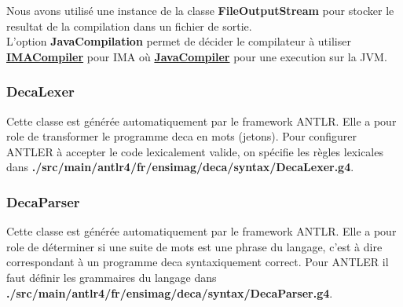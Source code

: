 \documentclass[12pt, a4paper, one side]{article}
\begin{document}
    Nous avons utilisé une instance de la classe \textbf{FileOutputStream} pour stocker le resultat de la compilation dans un fichier de sortie.\\

    L'option \textbf{JavaCompilation} permet de décider le compilateur à utiliser \textbf{\underline{IMACompiler}} pour IMA où \textbf{\underline{JavaCompiler}} pour une execution sur la JVM.

    \subsubsection{DecaLexer} Cette classe est générée automatiquement par le framework ANTLR. Elle a pour role de transformer le programme deca en mots (jetons). Pour configurer ANTLER à accepter le code lexicalement valide, on spécifie les règles lexicales dans \textbf{./src/main/antlr4/fr/ensimag/deca/syntax/DecaLexer.g4}.

    \subsubsection{DecaParser} Cette classe est générée automatiquement par le framework ANTLR. Elle a pour role de déterminer si une suite de mots est une phrase du langage, c'est à dire correspondant à un programme deca syntaxiquement correct. Pour ANTLER il faut définir les grammaires du langage dans \textbf{./src/main/antlr4/fr/ensimag/deca/syntax/DecaParser.g4}.
\end{document}
